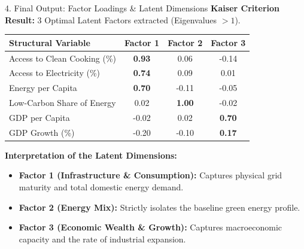\documentclass[aspectratio=169]{beamer}
\begin{document}
\begin{frame}{4. Final Output: Factor Loadings \& Latent Dimensions}
  \textbf{Kaiser Criterion Result:} 3 Optimal Latent Factors extracted (Eigenvalues $> 1$).
  \vspace{0.1cm}
  
  \begin{table}[]
      \centering
      \footnotesize
      \begin{tabular}{l c c c}
      \toprule
      \textbf{Structural Variable} & \textbf{Factor 1} & \textbf{Factor 2} & \textbf{Factor 3} \\
      \midrule
      Access to Clean Cooking (\%) & \textbf{0.93} & 0.06 & -0.14 \\
      Access to Electricity (\%) & \textbf{0.74} & 0.09 & 0.01 \\
      Energy per Capita & \textbf{0.70} & -0.11 & -0.05 \\
      Low-Carbon Share of Energy & 0.02 & \textbf{1.00} & -0.02 \\
      GDP per Capita & -0.02 & 0.02 & \textbf{0.70} \\
      GDP Growth (\%) & -0.20 & -0.10 & \textbf{0.17} \\
      \bottomrule
      \end{tabular}
  \end{table}
  \vspace{0.1cm}
  
  \textbf{Interpretation of the Latent Dimensions:}
  \begin{itemize}
      \small
      \item \textbf{Factor 1 (Infrastructure \& Consumption):} Captures physical grid maturity and total domestic energy demand.
      \item \textbf{Factor 2 (Energy Mix):} Strictly isolates the baseline green energy profile.
      \item \textbf{Factor 3 (Economic Wealth \& Growth):} Captures macroeconomic capacity and the rate of industrial expansion.
  \end{itemize}
\end{frame}
\end{document}
